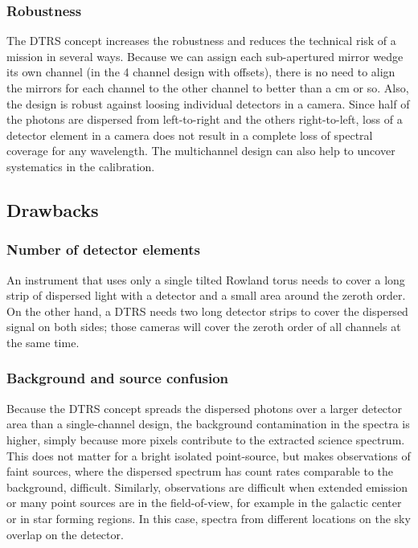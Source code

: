 \documentclass[twocolumn]{aastex631}
\begin{document}
\subsubsection{Robustness}
The DTRS concept increases the robustness and reduces the technical risk of a mission in several ways. Because we can assign each sub-apertured mirror wedge its own channel (in the 4 channel design with offsets), there is no need to align the mirrors for each channel to the other channel to better than a cm or so.
Also, the design is robust against loosing individual detectors in a camera. Since half of the photons are dispersed from left-to-right and the others right-to-left, loss of a detector element in a camera does not result in a complete loss of spectral coverage for any wavelength. The multichannel design can also help to uncover systematics in the calibration.




\subsection{Drawbacks}
\subsubsection{Number of detector elements}
An instrument that uses only a single tilted Rowland torus needs to cover a long strip of dispersed light with a detector and a small area around the zeroth order. On the other hand, a DTRS needs two long detector strips to cover the dispersed signal on both sides; those cameras will cover the zeroth order of all channels at the same time.

\subsubsection{Background and source confusion}
Because the DTRS concept spreads the dispersed photons over a larger detector area than a single-channel design, the background contamination in the spectra is higher, simply because more pixels contribute to the extracted science spectrum. This does not matter for a bright isolated point-source, but makes observations of faint sources, where the dispersed spectrum has count rates comparable to the background, difficult. Similarly, observations are difficult when extended emission or many point sources are in the field-of-view, for example in the galactic center or in star forming regions. In this case, spectra from different locations on the sky overlap on the detector.
\end{document}
